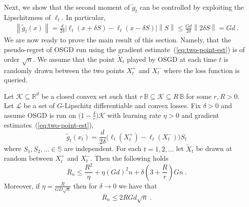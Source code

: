 \documentclass[11pt]{hackednow}
\newcommand{\R}{\mathbb{R}}
\newcommand{\cL}{\mathcal{L}}
\newcommand{\cK}{\mathcal{K}}
\newcommand{\oR}{\overline{R}}
\newcommand{\Ball}{\mathbb{B}}
\newcommand{\Sphere}{\mathbb{S}}
\newcommand{\norm}[1]{\left\|{#1}\right\|}
\newcommand{\tX}{\widetilde{X}}
\newcommand{\gtilde}{\widetilde{g}}
\begin{document}
Next, we show that the second moment of $\gtilde_t$ can be controlled by exploiting the Lipschitzness of $\ell_t$. In particular,
\begin{align*}
    \norm{\gtilde_t(x)}
=
    \frac{d}{2\delta}\bigl|\ell_t(x + \delta S) - \ell_t(x - \delta S)\bigr|\norm{S}
\le
    \frac{Gd}{2\delta}\norm{2\delta S}
=
    Gd~.
\end{align*}
We are now ready to prove the main result of this section. Namely, that the pseudo-regret of OSGD run using the gradient estimate~(\ref{eq:two-point-est}) is of order $\sqrt{n}$. We assume that the point $\tX_t$ played by OSGD at each time $t$ is randomly drawn between the two points $X_t^+$ and $X_t^-$ where the loss function is queried.
\begin{theorem}
\label{th:two-point}
Let $\cK\subseteq\R^d$ be a closed convex set such that $r\,\Ball\subseteq\cK\subseteq R\,\Ball$ for some $r,R > 0$. 
Let $\cL$ be a set of $G$-Lipschitz differentiable and convex losses.
Fix $\delta > 0$ and assume OSGD is run on $\bigl(1-\tfrac{\delta}{r}\bigr)\cK$ with learning rate $\eta > 0$ and gradient estimates~(\ref{eq:two-point-est}),
\[
    \gtilde_t(x_t) = \frac{d}{2\delta}\bigl( \ell_t(X_t^+) - \ell_t(X_t^-) \bigr)S_t
\]
where $S_1,S_2,\dots\in\Sphere$ are independent. For each $t=1,2,\dots$ let $\tX_t$ be drawn at random between $X_t^+$ and $X_t^-$. Then
the following holds
\[
\oR_n
\le
    \frac{R^2}{\eta} + \eta (Gd)^2 n + \delta\left(3 + \frac{R}{r} \right) G n~.
\]
Moreover, if $\eta = \tfrac{R}{GD\sqrt{n}}$ then for $\delta\to 0$ we have that
\[
\oR_n
\le
    2RGd\sqrt{n}~.
\]
\end{theorem}
\end{document}
